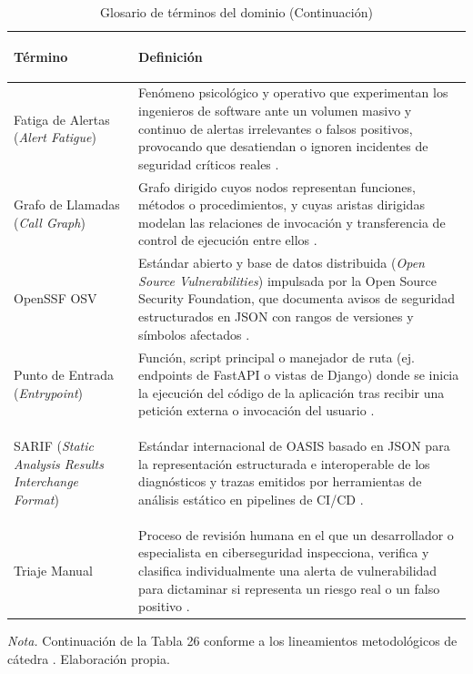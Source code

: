 \documentclass[12pt,a4paper]{article}
\begin{document}
\newpage

\begin{table}[H]
\centering
\ContinuedFloat
\caption{Glosario de términos del dominio (Continuación)}
\small
{}
\begin{tabularx}{\textwidth}{>{\bfseries\raggedright\arraybackslash}p{4.4cm} X}
\toprule
\textbf{Término} & \textbf{Definición} \\
\midrule
Fatiga de Alertas (\textit{Alert Fatigue}) & 
Fenómeno psicológico y operativo que experimentan los ingenieros de software ante un volumen masivo y continuo de alertas irrelevantes o falsos positivos, provocando que desatiendan o ignoren incidentes de seguridad críticos reales \parencite{johnson2013developers, sadowski2018lessons}. \\
\addlinespace
Grafo de Llamadas (\textit{Call Graph}) & 
Grafo dirigido cuyos nodos representan funciones, métodos o procedimientos, y cuyas aristas dirigidas modelan las relaciones de invocación y transferencia de control de ejecución entre ellos \parencite{ryder1979constructing, salis2021pycg}. \\
\addlinespace
OpenSSF OSV & 
Estándar abierto y base de datos distribuida (\textit{Open Source Vulnerabilities}) impulsada por la Open Source Security Foundation, que documenta avisos de seguridad estructurados en JSON con rangos de versiones y símbolos afectados \parencite{openssf2023osv}. \\
\addlinespace
Punto de Entrada (\textit{Entrypoint}) & 
Función, script principal o manejador de ruta (ej. endpoints de FastAPI o vistas de Django) donde se inicia la ejecución del código de la aplicación tras recibir una petición externa o invocación del usuario \parencite{salis2021pycg}. \\
\addlinespace
SARIF (\textit{Static Analysis Results Interchange Format}) & 
Estándar internacional de OASIS basado en JSON para la representación estructurada e interoperable de los diagnósticos y trazas emitidos por herramientas de análisis estático en pipelines de CI/CD \parencite{oasis2019sarif}. \\
\addlinespace
Triaje Manual & 
Proceso de revisión humana en el que un desarrollador o especialista en ciberseguridad inspecciona, verifica y clasifica individualmente una alerta de vulnerabilidad para dictaminar si representa un riesgo real o un falso positivo \parencite{pashchenko2022vuln4real, sadowski2018lessons}. \\
\bottomrule
\end{tabularx}
\vspace{2pt}
\begin{flushleft}
\scriptsize \textit{Nota.} Continuación de la Tabla 26 conforme a los lineamientos metodológicos de cátedra \parencite{torres2026proyecto}. Elaboración propia.
\end{flushleft}

\end{table}
\end{document}
